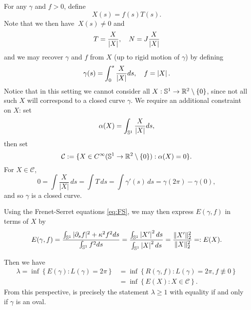 For any \(\gamma\) and \(f > 0\), define
\begin{equation}
\label{eq:X}
X(s) %
= f(s) T(s).
\end{equation}
Note that we then have \( \> X(s) \ne 0   \) and
\begin{equation}
\label{eq:TNX}
T = \frac{X}{\abs{X}}, \quad %
N = J \frac{X}{\abs{X}}
\end{equation}
and we may recover \(\gamma\) and \(f\) 
from \(X\) (up to rigid motion of \(\gamma\)) by defining
\begin{equation}
\label{eq:gammaX}
\gamma(s)%
= \int_0^s \frac{X}{\abs{X}} ds, \quad f = \abs{X}.
\end{equation}
Notice that in this setting we cannot consider all $X:\operatorname{\mathbb{S}^1}\to {\mathbb R}^2\setminus\lbrace0\rbrace$, since not all such $X$ will correspond to a closed curve $\gamma$.  We require an additional constraint on $X$: set
\begin{equation}
\label{eq:alpha}
\alpha(X)= \int_{\operatorname{\mathbb{S}^1}} \frac{X}{\left|{X}\right|} ds,
\end{equation}
then set
\[
\mathcal{C}:= \lbrace X \in C^{\infty}(\operatorname{\mathbb{S}^1}\to {\mathbb R}^2\setminus\lbrace0\rbrace) :  \alpha(X)=0\rbrace.
\]
For $X\in\mathcal{C}$, $$0=\int \frac X{|X|}\,ds=\int T\,ds=\int \gamma'(s)\,ds= \gamma(2\pi)-\gamma(0),$$ and so $\gamma$ is a closed curve.


Using the Frenet-Serret equations \eqref{eq:FS}, we may then express \(E(\gamma, f)\) in terms of \(X\) by
\begin{equation}
\label{eq:gammafX}
E(\gamma, f) = \frac{\int_{\operatorname{\mathbb{S}^1}} |\partial_s f|^2 + \kappa^2 f^2 ds}{\int_{\operatorname{\mathbb{S}^1}} f^2 ds} = \frac{\int_{\operatorname{\mathbb{S}^1}} \left|{X'}\right|^2 ds}{\int_{\operatorname{\mathbb{S}^1}} \left|{X}\right|^2 ds} = \frac{\|X'\|_2^2}{\|X\|_2^2} =: E(X).
\end{equation}

Then we have
\begin{equation}
\label{eq:infimums}
\begin{split}
\lambda = \inf\left\{E(\gamma) : L(\gamma) = 2\pi\right\} &= \inf\left\{R(\gamma, f) : L(\gamma) = 2\pi, f \not\equiv 0\right\} \\
&= \inf\left\{E(X) :  X\in\mathcal{C} %
\right\}.
\end{split}
\end{equation}
From this perspective,  is precisely the statement \(\lambda \geq 1\) with equality if and only if \(\gamma\) is an oval.


